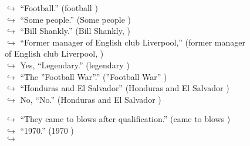 \documentclass[11pt,a4paper, onecolumn]{article}
\begin{document}
\begin{figure}[t] \small \begin{tcolorbox}[boxsep=0pt,left=5pt,right=0pt,top=2pt,colback = yellow!5] \begin{dialogue}
 \small 
\colorbox{pink!25}{$\hookrightarrow$}
{ ``Football.'' (football ) }
\\
\colorbox{pink!25}{$\hookrightarrow$}
{ ``Some people.'' (Some people ) }
\\
\colorbox{pink!25}{$\hookrightarrow$}
{ ``Bill Shankly.'' (Bill Shankly, ) }
\\
\colorbox{pink!25}{$\hookrightarrow$}
{ ``Former manager of English club Liverpool,'' (former manager of English club Liverpool, ) }
\\
\colorbox{pink!25}{$\hookrightarrow$}
\colorbox{red!25}{Yes,}
{ ``Legendary.'' (legendary ) }
\\
\colorbox{pink!25}{$\hookrightarrow$}
{ ``The ''Football War''.'' (''Football War'' ) }
\\
\colorbox{pink!25}{$\hookrightarrow$}
{ ``Honduras and El Salvador'' (Honduras and El Salvador ) }
\\
\colorbox{pink!25}{$\hookrightarrow$}
\colorbox{red!25}{No,}
{ ``No.'' (Honduras and El Salvador ) }
 \end{dialogue}\end{tcolorbox}\end{figure}\begin{figure}[t] \small \begin{tcolorbox}[boxsep=0pt,left=5pt,right=0pt,top=2pt,colback = yellow!5] \begin{dialogue}
 \small 
\colorbox{pink!25}{$\hookrightarrow$}
{ ``They came to blows after qualification.'' (came to blows ) }
\\
\colorbox{pink!25}{$\hookrightarrow$}
{ ``1970.'' (1970 ) }
\\
\colorbox{pink!25}{$\hookrightarrow$}

\end{dialogue}
\end{tcolorbox}
\end{figure}
\end{document}
